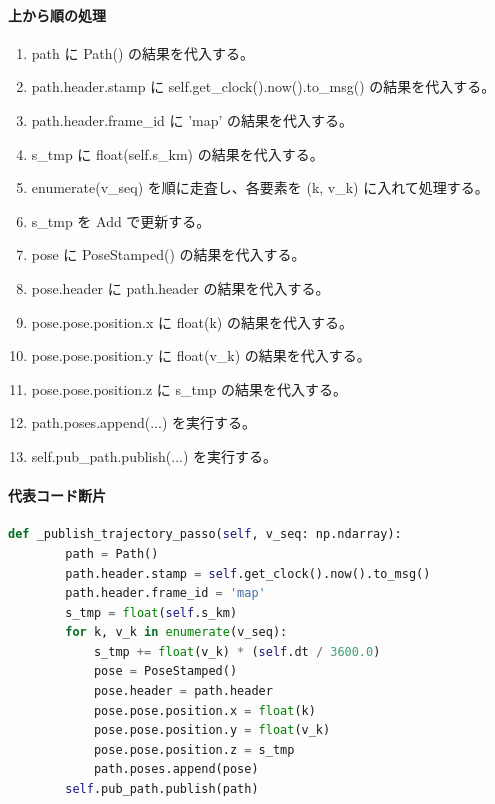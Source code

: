 \documentclass[a4paper,11pt]{article}
\begin{document}
            \paragraph{上から順の処理}
            \begin{enumerate}[leftmargin=1.8em]
            \item path に Path() の結果を代入する。
\item path.header.stamp に self.get\_clock().now().to\_msg() の結果を代入する。
\item path.header.frame\_id に 'map' の結果を代入する。
\item s\_tmp に float(self.s\_km) の結果を代入する。
\item enumerate(v\_seq) を順に走査し、各要素を (k, v\_k) に入れて処理する。
\item   s\_tmp を Add で更新する。
\item   pose に PoseStamped() の結果を代入する。
\item   pose.header に path.header の結果を代入する。
\item   pose.pose.position.x に float(k) の結果を代入する。
\item   pose.pose.position.y に float(v\_k) の結果を代入する。
\item   pose.pose.position.z に s\_tmp の結果を代入する。
\item   path.poses.append(...) を実行する。
\item self.pub\_path.publish(...) を実行する。
            \end{enumerate}
            \paragraph{代表コード断片}
            \begin{lstlisting}[language=Python]
    def _publish_trajectory_passo(self, v_seq: np.ndarray):
        path = Path()
        path.header.stamp = self.get_clock().now().to_msg()
        path.header.frame_id = 'map'
        s_tmp = float(self.s_km)
        for k, v_k in enumerate(v_seq):
            s_tmp += float(v_k) * (self.dt / 3600.0)
            pose = PoseStamped()
            pose.header = path.header
            pose.pose.position.x = float(k)
            pose.pose.position.y = float(v_k)
            pose.pose.position.z = s_tmp
            path.poses.append(pose)
        self.pub_path.publish(path)
\end{lstlisting}
\end{document}

